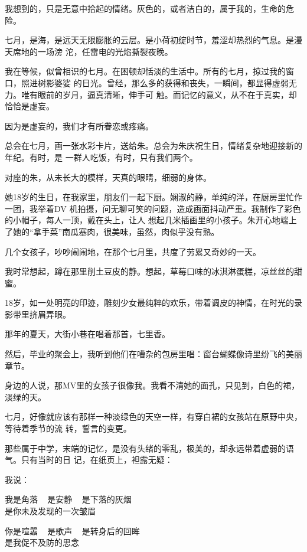 \documentclass[12pt,a4paper]{article}
\begin{document}
		我想到的，只是无意中拾起的情绪。灰色的，或者洁白的，属于我的，生命的危险。

	\endwriting



		七月，是海，是远天无限膨胀的云层。是小荷初绽时节，羞涩却热烈的气息。是漫天席地的一场滂
	沱，任雷电的光焰撕裂夜晚。


		我在等候，似曾相识的七月。在困顿却恬淡的生活中。所有的七月，掠过我的窗口，照进树影婆娑
	的日光。曾经，那么多的获得和丧失，一瞬间，都显得虚弱无力。唯有眼前的岁月，逼真清晰，伸手可
	触。而记忆的意义，从不在于真实，却恰恰是虚妄。


		因为是虚妄的，我们才有所眷恋或疼痛。


		总会在七月，画一张水彩卡片，送给朱。总会为朱庆祝生日，情绪复杂地迎接新的年纪。有时，是
	一群人吃饭，有时，只有我们两个。

		对座的朱，从未长大的模样，天真的眼睛，细弱的身体。

		她18岁的生日，在我家里，朋友们一起下厨。娴淑的静，单纯的洋，在厨房里忙作一团，我举着DV
	机拍摄，问无聊可笑的问题，造成画面抖动严重。我制作了彩色的小帽子，每人一顶，戴在头上，让人
	想起几米插画里的小孩子。朱开心地端上了她的“拿手菜”南瓜塞肉，很美味，虽然，肉似乎没有熟。

		几个女孩子，吵吵闹闹地，在那个七月里，共度了劳累又奇妙的一天。

		我时常想起，蹲在那里削土豆皮的静。想起，草莓口味的冰淇淋蛋糕，凉丝丝的甜蜜。


		18岁，如一处明亮的印迹，雕刻少女最纯粹的欢乐，带着调皮的神情，在时光的录影带里挤眉弄眼。


		那年的夏天，大街小巷在唱着那首，七里香。

		然后，毕业的聚会上，我听到他们在嘈杂的包房里唱：窗台蝴蝶像诗里纷飞的美丽章节。


		身边的人说，那MV里的女孩子很像我。我看不清她的面孔，只见到，白色的裙，淡绿的天。


		七月，好像就应该有那样一种淡绿色的天空一样，有穿白裙的女孩站在原野中央，等待着季节的流
	转，誓言的变更。

		那些属于中学，末端的记忆，是没有头绪的零乱，极美的，却永远带着虚弱的语气。只有当时的日
	记，在纸页上，袒露无疑：


		我说：

		\longpoem{}{}{}

		我是角落 ~ 是安静 ~ 是下落的灰烟 \\
		是你未及发现的一次皱眉


		你是喧嚣 ~ 是歌声 ~ 是转身后的回眸 \\
		是我促不及防的思念
		\endlongpoem
\end{document}
